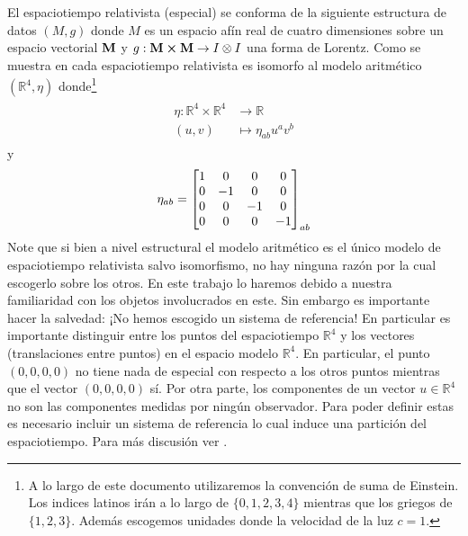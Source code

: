 \documentclass[11pt]{article}
\begin{document}
El espaciotiempo relativista (especial) se conforma de la siguiente estructura de datos $(M,g)$ donde $M$ es un espacio afín real de cuatro dimensiones sobre un espacio vectorial $\vb{M}$ y $g:\vb{M}\cross\vb{M}\rightarrow I\otimes I$ una forma de Lorentz. Como se muestra en \cite{Matolcsi1993} cada espaciotiempo relativista es isomorfo al modelo aritmético $(\mathbb{R}^4,\eta)$ donde\footnote{A lo largo de este documento utilizaremos la convención de suma de Einstein. Los indices latinos irán a lo largo de $\{0,1,2,3,4\}$ mientras que los griegos de $\{1,2,3\}$. Además escogemos unidades donde la velocidad de la luz $c=1$.}
\begin{align}
\begin{split}
\eta:\mathbb{R}^4\times\mathbb{R}^4&\rightarrow\mathbb{R} \\
(u,v)&\mapsto \eta_{ab}u^a v^b
\end{split}
\end{align}  
y 
\begin{equation}
\eta_{ab}=\mqty[1 & 0 & 0 & 0 \\ 0 & -1 & 0 & 0 \\ 0 & 0 & -1 & 0 \\ 0 & 0 & 0 & -1]_{ab}
\end{equation}
Note que si bien a nivel estructural el modelo aritmético es el único modelo de espaciotiempo relativista salvo isomorfismo, no hay ninguna razón por la cual escogerlo sobre los otros. En este trabajo lo haremos debido a nuestra familiaridad con los objetos involucrados en este. Sin embargo es importante hacer la salvedad: ¡No hemos escogido un sistema de referencia! En particular es importante distinguir entre los puntos del espaciotiempo $\mathbb{R}^4$ y los vectores (translaciones entre puntos) en el espacio modelo $\mathbb{R}^4$. En particular, el punto $(0,0,0,0)$ no tiene nada de especial con respecto a los otros puntos mientras que el vector $(0,0,0,0)$ sí. Por otra parte, los componentes de un vector $u\in\mathbb{R}^4$ no son las componentes medidas por ningún observador. Para poder definir estas es necesario incluir un sistema de referencia lo cual induce una partición del espaciotiempo. Para más discusión ver \cite{Matolcsi1993}.
\end{document}
